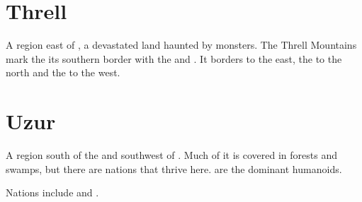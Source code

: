 \section{Threll}
A region east of , a devastated land haunted by monsters. The Threll Mountains mark the its southern border with the  and . It borders  to the east, the  to the north and the  to the west. 















\section{Uzur}
A region south of the  and southwest of . 
Much of it is covered in  forests and swamps, but there are nations that thrive here. 
\Meccara{} are the dominant humanoids. 

Nations include  and . 




































































 
